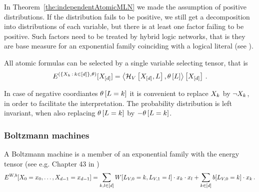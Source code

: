 
In Theorem~\ref{the:independentAtomicMLN} we made the assumption of positive distributions.
If the distribution fails to be positive, we still get a decomposition into distributions of each variable, but there is at least one factor failing to be positive.
Such factors need to be treated by hybrid logic networks, that is they are base measure for an exponential family coinciding with a logical literal (see ).

All atomic formulas can be selected by a single variable selecting tensor, that is
	\[ E^{(\{X_{k} \, : \, k\in[d]\},\theta)}[X_{[d]}]
	= \left\langle \mathcal{H}_{V}\left[X_{[d]},L\right],\theta\left[L\right]\right\rangle \left[ X_{[d]} \right] \, . 
	\]
	
In case of negative coordiantes $\theta\left[L=k\right]$ it is convenient to replace $X_{k}$ by $\lnot X_{k}$, in order to facilitate the interpretation.
The probability distribution is left invariant, when also replacing $\theta\left[L=k\right]$ by $-\theta\left[L=k\right]$.



\subsubsection{Boltzmann machines}


A Boltzmann machine is a member of an exponential family with the energy tensor (see e.g. Chapter 43 in \cite{mackay_information_2003})
	\[ E^{W,b}[X_{0}=x_{0},\ldots,X_{d-1}=x_{d-1}] = 
	\sum_{k,l \in [d]} 
		W[L_{V,0}=k, L_{V,1}=l] \cdot x_{k} \cdot x_{l} 
	+ \sum_{k\in[d]} b[L_{V,0}=k] \cdot x_{k}\, . \]



